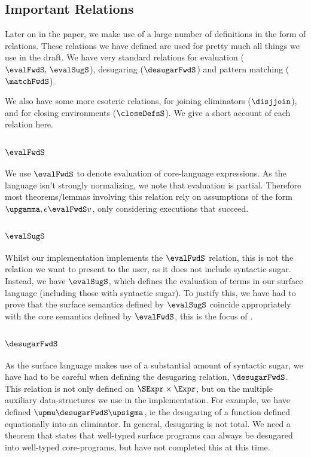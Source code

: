 \subsection{Important Relations}
Later on in the paper, we make use of a large number of definitions in the form of relations. These relations 
we have defined are used for pretty much all things we use in the draft. We have very standard relations
for evaluation ($\evalFwdS,\,\evalSugS$), desugaring ($\desugarFwdS$) and pattern matching ($\matchFwdS$).

We also have some more esoteric relations, for joining eliminators ($\disjjoin$), and for closing environments
($\closeDefsS$). We give a short account of each relation here.

\subsubsection{$\evalFwdS$}
We use $\evalFwdS$ to denote evaluation of core-language expressions. As the language isn't strongly
normalizing, we note that evaluation is partial. Therefore most theorems/lemmas involving this relation
rely on assumptions of the form $\upgamma,e\evalFwdS v$, only considering executions that succeed.
\subsubsection{$\evalSugS$}
Whilst our implementation implements the $\evalFwdS$ relation, this is not the relation
we want to present to the user, as it does not include syntactic sugar. Instead, we have $\evalSugS$,
which defines the evaluation of terms in our surface language (including those with syntactic sugar).
To justify this, we have had to prove that the surface semantics defined by $\evalSugS$ coincide 
appropriately with the core semantics defined by $\evalFwdS$, this is the focus of .

\subsubsection{$\desugarFwdS$}
As the surface language makes use of a substantial amount of syntactic sugar, we have had to be careful
when defining the desugaring relation, $\desugarFwdS$. This relation is not only defined on $\SExpr \times \Expr$,
but on the multiple auxiliary data-structures we use in the implementation. For example, we have defined
$\upmu \desugarFwdS \upsigma$, ie the desugaring of a function defined equationally into an eliminator.
In general, desugaring is not total. We need a theorem that states that well-typed surface programs can
always be desugared into well-typed core-programs, but have not completed this at this time.

